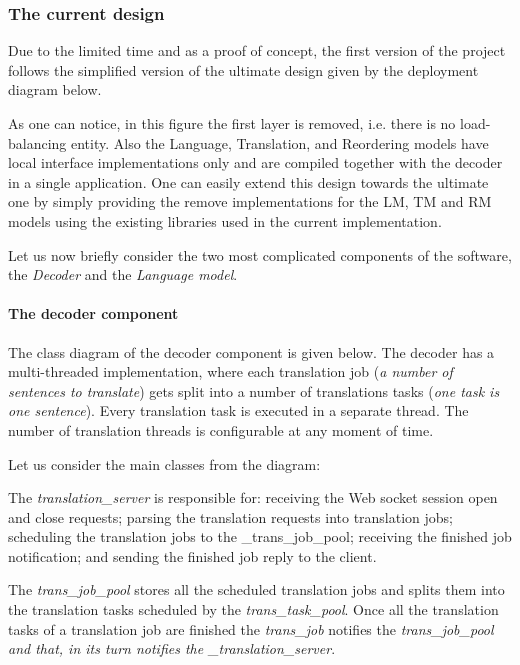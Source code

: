 \subsubsection*{The current design}

Due to the limited time and as a proof of concept, the first version of the project follows the simplified version of the ultimate design given by the deployment diagram below.



As one can notice, in this figure the first layer is removed, i.\+e. there is no load-\/balancing entity. Also the Language, Translation, and Reordering models have local interface implementations only and are compiled together with the decoder in a single application. One can easily extend this design towards the ultimate one by simply providing the remove implementations for the L\+M, T\+M and R\+M models using the existing libraries used in the current implementation.

Let us now briefly consider the two most complicated components of the software, the {\itshape Decoder} and the {\itshape Language model}.

\paragraph*{The decoder component}

The class diagram of the decoder component is given below. The decoder has a multi-\/threaded implementation, where each translation job ({\itshape a number of sentences to translate}) gets split into a number of translations tasks ({\itshape one task is one sentence}). Every translation task is executed in a separate thread. The number of translation threads is configurable at any moment of time.



Let us consider the main classes from the diagram\+:

The {\itshape translation\+\_\+server} is responsible for\+: receiving the Web socket session open and close requests; parsing the translation requests into translation jobs; scheduling the translation jobs to the \+\_\+trans\+\_\+job\+\_\+pool; receiving the finished job notification; and sending the finished job reply to the client.

The {\itshape trans\+\_\+job\+\_\+pool} stores all the scheduled translation jobs and splits them into the translation tasks scheduled by the {\itshape trans\+\_\+task\+\_\+pool}. Once all the translation tasks of a translation job are finished the {\itshape trans\+\_\+job} notifies the {\itshape trans\+\_\+job\+\_\+pool and that, in its turn notifies the \+\_\+translation\+\_\+server}.

